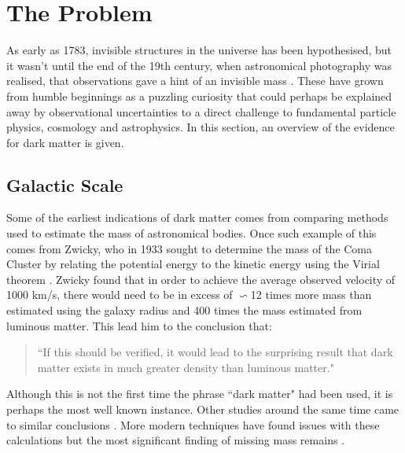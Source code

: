 \section{The Problem}

\par
As early as 1783, invisible structures in the universe has been hypothesised, but it wasn't until the end of the 19th century, when astronomical photography was realised, that observations gave a hint of an invisible mass \cite{History_Of_Dark_Matter_2018_ref}.
These have grown from humble beginnings as a puzzling curiosity that could perhaps be explained away by observational uncertainties to a direct challenge to fundamental particle physics, cosmology and astrophysics.
In this section, an overview of the evidence for dark matter is given.

%
%


\subsection{Galactic Scale}

\par
Some of the earliest indications of dark matter comes from comparing methods used to estimate the mass of astronomical bodies.
Once such example of this comes from Zwicky, who in 1933 sought to determine the mass of the Coma Cluster by relating the potential energy to the kinetic energy using the Virial theorem \cite{Fritz_Zwicky_1933_ref}.
Zwicky found that in order to achieve the average observed velocity of 1000 km/s, there would need to be in excess of $\backsim$12 times more mass than estimated using the galaxy radius and 400 times the mass estimated from luminous matter.
This lead him to the conclusion that:
\begin{quote}
``If this should be verified, it would lead to the surprising result that dark matter
exists in much greater density than luminous matter."
\end{quote}
Although this is not the first time the phrase ``dark matter" had been used, it is perhaps the most well known instance.
Other studies around the same time came to similar conclusions \cite{hubble_and_co_viral_theorem_ref}.
More modern techniques have found issues with these calculations but the most significant finding of missing mass remains \cite{a_second_history_of_dark_matter_ref}.

